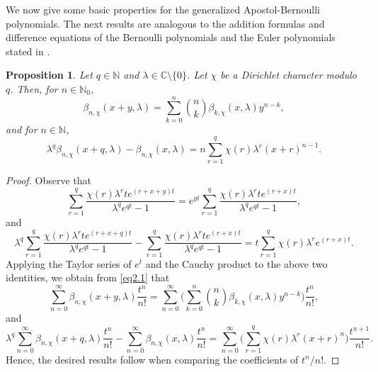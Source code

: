 \documentclass[reqno]{amsart}
\numberwithin{equation}{section}
\newtheorem{proposition}[thm]{Proposition}
\begin{document}
We now give some basic properties for the generalized Apostol-Bernoulli polynomials. The next results are analogous to the addition formulas and difference equations of the Bernoulli polynomials and the Euler polynomials stated in \cite[Chapter 2]{norlund}.

\begin{proposition}\label{pro2.2} Let $q\in\mathbb{N}$ and $\lambda\in\mathbb{C}\setminus\{0\}$. Let $\chi$ be a Dirichlet character modulo $q$. Then, for $n\in\mathbb{N}_{0}$,
\begin{equation}\label{eq2.10}
\beta_{n,\chi}(x+y,\lambda)=\sum_{k=0}^{n}\binom{n}{k}\beta_{k,\chi}(x,\lambda)y^{n-k},
\end{equation}
and for $n\in\mathbb{N}$,
\begin{equation}\label{eq2.11}
\lambda^{q}\beta_{n,\chi}(x+q,\lambda)-\beta_{n,\chi}(x,\lambda)=n\sum_{r=1}^{q}\chi(r)\lambda^{r}(x+r)^{n-1}.
\end{equation}
\end{proposition}

\begin{proof}
Observe that
\begin{equation*}
\sum_{r=1}^{q}\frac{\chi(r)\lambda^{r}te^{(r+x+y)t}}{\lambda^{q}e^{qt}-1}=e^{yt}\sum_{r=1}^{q}\frac{\chi(r)\lambda^{r}te^{(r+x)t}}{\lambda^{q}e^{qt}-1},
\end{equation*}
and
\begin{equation*}
\lambda^{q}\sum_{r=1}^{q}\frac{\chi(r)\lambda^{r}te^{(r+x+q)t}}{\lambda^{q}e^{qt}-1}-\sum_{r=1}^{q}\frac{\chi(r)\lambda^{r}te^{(r+x)t}}{\lambda^{q}e^{qt}-1}=t\sum_{r=1}^{q}\chi(r)\lambda^{r}e^{(r+x)t}.
\end{equation*}
Applying the Taylor series of $e^{t}$ and the Cauchy product to the above two identities, we obtain from \eqref{eq2.1} that
\begin{equation*}
\sum_{n=0}^{\infty}\beta_{n,\chi}(x+y,\lambda)\frac{t^{n}}{n!}=\sum_{n=0}^{\infty}\biggl(\sum_{k=0}^{n}\binom{n}{k}\beta_{k,\chi}(x,\lambda)y^{n-k}\biggl)\frac{t^{n}}{n!},
\end{equation*}
and
\begin{equation*}
\lambda^{q}\sum_{n=0}^{\infty}\beta_{n,\chi}(x+q,\lambda)\frac{t^{n}}{n!}-\sum_{n=0}^{\infty}\beta_{n,\chi}(x,\lambda)\frac{t^{n}}{n!}
=\sum_{n=0}^{\infty}\biggl(\sum_{r=1}^{q}\chi(r)\lambda^{r}(x+r)^{n}\biggl)\frac{t^{n+1}}{n!}.
\end{equation*}
Hence, the desired results follow when comparing the coefficients of $t^{n}/n!$.
\end{proof}
\end{document}
